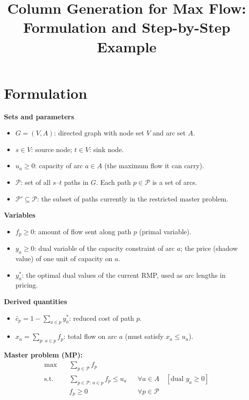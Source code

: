 \documentclass[11pt]{article}
\title{Column Generation for Max Flow: Formulation and Step-by-Step Example}
\author{}
\date{}
\begin{document}
\maketitle

\section{Formulation}
\textbf{Sets and parameters}
\begin{itemize}
  \item $G=(V,A)$: directed graph with node set $V$ and arc set $A$.
  \item $s\in V$: source node; $t\in V$: sink node.
  \item $u_a\ge 0$: capacity of arc $a\in A$ (the maximum flow it can carry).
  \item $\mathcal{P}$: set of all $s$--$t$ paths in $G$. Each path $p\in\mathcal{P}$ is a set of arcs.
  \item $\mathcal{P}'\subseteq\mathcal{P}$: the subset of paths currently in the restricted master problem.
\end{itemize}

\textbf{Variables}
\begin{itemize}
  \item $f_p\ge 0$: amount of flow sent along path $p$ (primal variable).
  \item $y_a\ge 0$: dual variable of the capacity constraint of arc $a$; the price (shadow value) of one unit of capacity on $a$.
  \item $y^*_a$: the optimal dual values of the current RMP, used as arc lengths in pricing.
\end{itemize}

\textbf{Derived quantities}
\begin{itemize}
  \item $\bar c_p = 1-\sum_{a\in p}y^*_a$: reduced cost of path $p$.
  \item $x_a=\sum_{p:\,a\in p}f_p$: total flow on arc $a$ (must satisfy $x_a\le u_a$).
\end{itemize}

\textbf{Master problem (MP):}
\begin{align*}
\max\quad & \sum_{p\in\mathcal{P}} f_p\\
\text{s.t.}\quad & \sum_{p\in\mathcal{P}:\,a\in p} f_p \le u_a && \forall a\in A \quad [\text{dual } y_a\ge 0]\\
& f_p\ge 0 && \forall p\in\mathcal{P}
\end{align*}
\end{document}
